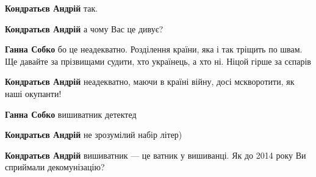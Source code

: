 \begin{itemize}
\begin{itemize}
\textbf{Кондратьєв Андрій} так.

 
\textbf{Кондратьєв Андрій} а чому Вас це дивує?

\begin{itemize}
 
\textbf{Ганна Собко} бо це неадекватно. Розділення країни, яка і так тріщить по швам. Ще давайте за прізвищами судити, хто українець, а хто ні. Ніцой гірше за сєпарів

 
\textbf{Кондратьєв Андрій} неадекватно, маючи в країні війну, досі мскворотити, як наші окупанти!

 
\textbf{Ганна Собко} вишиватник детектед

 
\textbf{Кондратьєв Андрій} не зрозумілий набір літер)

 
\textbf{Кондратьєв Андрій} вишиватник — це ватник у вишиванці. Як до 2014 року Ви сприймали декомунізацію?


\end{itemize}
\end{itemize}
\end{itemize}
